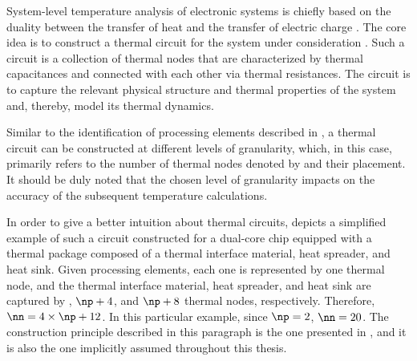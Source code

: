 System-level temperature analysis of electronic systems is chiefly based on the
duality between the transfer of heat and the transfer of electric charge
\cite{kreith2000}. The core idea is to construct a thermal  circuit for
the system under consideration \cite{skadron2003}. Such a circuit is a
collection of thermal nodes that are characterized by thermal capacitances and
connected with each other via thermal resistances. The circuit is to capture the
relevant physical structure and thermal properties of the system and, thereby,
model its thermal dynamics.

Similar to the identification of processing elements described in
, a thermal  circuit can be constructed at different
levels of granularity, which, in this case, primarily refers to the number of
thermal nodes denoted by \nn and their placement. It should be duly noted that
the chosen level of granularity impacts on the accuracy of the subsequent
temperature calculations.

In order to give a better intuition about thermal  circuits,
 depicts a simplified example of such a circuit
constructed for a dual-core chip equipped with a thermal package composed of a
thermal interface material, heat spreader, and heat sink. Given \np processing
elements, each one is represented by one thermal node, and the thermal interface
material, heat spreader, and heat sink are captured by \np, $\np + 4$, and $\np
+ 8$ thermal nodes, respectively. Therefore, $\nn = 4 \times \np + 12$. In this
particular example, since $\np = 2$, $\nn = 20$. The construction principle
described in this paragraph is the one presented in \cite{huang2008}, and it is
also the one implicitly assumed throughout this thesis.

